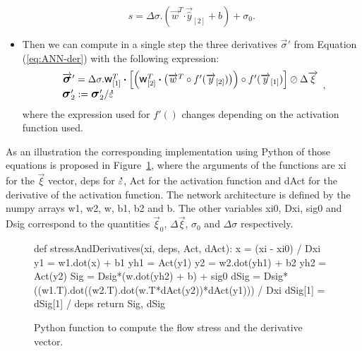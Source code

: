 \documentclass[algorithms,article,submit,pdftex,oneauthors]{Definitions/mdpi}
\DeclareRobustCommand{\w}{\mbox{\large\ensuremath{\mathsf{w}}}}
\DeclareRobustCommand{\dotp}{\boldsymbol{\cdot}}
\DeclareRobustCommand{\lay}[1]{_{[#1]}}
\DeclareRobustCommand{\mdot}[1]{\accentset{\mbox{\bfseries .}}{#1}}
\DeclareRobustCommand{\Sig}{\mbox{\large\ensuremath{\boldsymbol{\sigma}}}}
\DeclareRobustCommand{\var}[1]{\textsf{#1}}
\begin{document}
\begin{itemize}
\begin{equation}
s = \Delta\sigma.\left(\overrightarrow{w}^T \dotp \overrightarrow{\hat{y}}\lay{2} + b\right) + \sigma_{0}.
\end{equation}
\item Then we can compute in a single step the three derivatives $\overrightarrow{\sigma}'$ from Equation (\ref{eq:ANN-der}) with the following expression:
\begin{equation}
\begin{array}{l}
\overrightarrow{\Sig}' = \Delta\sigma.\w\lay{1}^T \dotp\left[\left(\w\lay{2}^T \dotp \left(\overrightarrow{w}^T \circ f'(\overrightarrow{y}\lay{2})\right)\right) \circ f'(\overrightarrow{y}\lay{1})\right] \oslash \Delta\overrightarrow{\xi}\\
\Sig_{2}' := \Sig_{2}' / \mdot{\varepsilon}
\end{array},
\end{equation}
where the expression used for $f'()$ changes depending on the activation function used.
\end{itemize}
As an illustration the corresponding implementation using Python of those equations is proposed in Figure~\ref{fig:PythonStress}, where the arguments of the functions are \var{xi} for the $\overrightarrow{\xi}$ vector, \var{deps} for $\mdot{\varepsilon}$, \var{Act} for the activation function and \var{dAct} for the derivative of the activation function.
The network architecture is defined by the numpy arrays \var{w1}, \var{w2}, \var{w}, \var{b1}, \var{b2} and \var{b}.
The other variables \var{xi0}, \var{Dxi}, \var{sig0} and \var{Dsig} correspond to the quantities $\overrightarrow{\xi}_{0}$, $\Delta\overrightarrow{\xi}$, $\sigma_{0}$ and $\Delta\sigma$ respectively.
\begin{figure}[h!]
\begin{PythonListing}
def stressAndDerivatives(xi, deps, Act, dAct):
  x = (xi - xi0) / Dxi
  y1 = w1.dot(x) + b1
  yh1 = Act(y1)
  y2 = w2.dot(yh1) + b2
  yh2 = Act(y2)
  Sig = Dsig*(w.dot(yh2) + b) + sig0
  dSig = Dsig*((w1.T).dot((w2.T).dot(w.T*dAct(y2))*dAct(y1))) / Dxi
  dSig[1] = dSig[1] / deps
  return Sig, dSig
\end{PythonListing}
\caption{Python function to compute the flow stress and the derivative vector.\label{fig:PythonStress}}
\end{figure}
\end{document}
